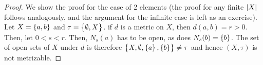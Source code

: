 \begin{proof}
    We show the proof for the case of 2 elements (the proof for any finite $\abs{X}$ follows analogously, and the argument for the infinite case is left as an exercise). Let $X = \set{a, b}$ and $\tau = \set{\emptyset, X}$. if $d$ is a metric on $X$, then $d(a, b) = r > 0$. Then, let $0 < s < r$. Then, $N_{s}(a)$ has to be open, as does $N_{s}(b) = \set{b}$. The set of open sets of $X$ under $d$ is therefore $\set{X, \emptyset, \set{a}, \set{b}} \neq \tau$ and hence $(X, \tau)$ is not metrizable.
\end{proof}


